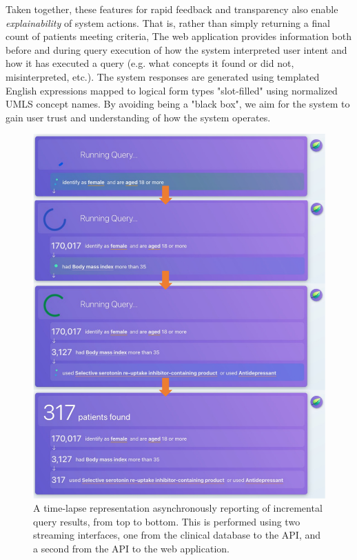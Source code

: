 \documentclass[../main.tex]{subfiles}
\begin{document}
Taken together, these features for rapid feedback and transparency also enable \textit{explainability} of system actions. That is, rather than simply returning a final count of patients meeting criteria, The web application provides information both before and during query execution of how the system interpreted user intent and how it has executed a query (e.g. what concepts it found or did not, misinterpreted, etc.). The system responses are generated using templated English expressions mapped to logical form types "slot-filled" using normalized UMLS concept names. By avoiding being a "black box", we aim for the system to gain user trust and understanding of how the system operates.

\begin{figure}[H]
  \centering
  \includegraphics[scale=0.65]{Figures/8_web_application/leafai_query_progress.pdf}  
  \caption{A time-lapse representation asynchronously reporting of incremental query results, from top to bottom. This is performed using two streaming interfaces, one from the clinical database to the API, and a second from the API to the web application.}
\label{fig_leafai_query_progress}
\end{figure}
\end{document}
